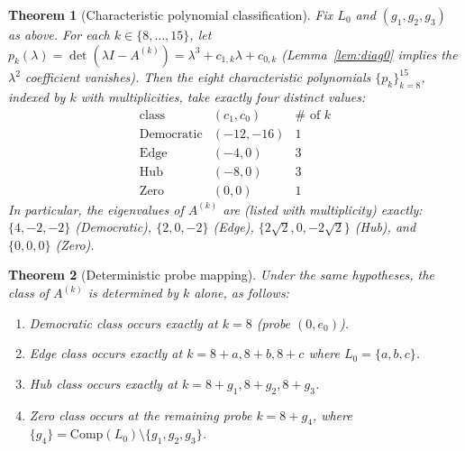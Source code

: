\documentclass[12pt,a4paper]{article}
\newtheorem{theorem}{Theorem}[section]
\begin{document}
\begin{theorem}[Characteristic polynomial classification]\label{thm:classification}
Fix $L_0$ and $(g_1,g_2,g_3)$ as above.
For each $k\in\{8,\dots,15\}$, let $p_k(\lambda)=\det(\lambda I-A^{(k)})=\lambda^3+c_{1,k}\lambda+c_{0,k}$ (Lemma~\ref{lem:diag0} implies the $\lambda^2$ coefficient vanishes).
Then the eight characteristic polynomials $\{p_k\}_{k=8}^{15}$, indexed by $k$ with multiplicities, take exactly four distinct values:
\[
\begin{array}{c|c|c}
\text{class} & (c_1,c_0) & \#\text{ of }k\\\hline
\text{Democratic} & (-12,-16) & 1\\
\text{Edge} & (-4,0) & 3\\
\text{Hub} & (-8,0) & 3\\
\text{Zero} & (0,0) & 1
\end{array}
\]
In particular, the eigenvalues of $A^{(k)}$ are (listed with multiplicity) exactly:
$\{4, -2, -2\}$ (Democratic), $\{2, 0, -2\}$ (Edge), $\{2\sqrt{2}, 0, -2\sqrt{2}\}$ (Hub), and $\{0, 0, 0\}$ (Zero).
\end{theorem}

\begin{theorem}[Deterministic probe mapping]\label{thm:strong}
Under the same hypotheses, the class of $A^{(k)}$ is determined by $k$ alone, as follows:
\begin{enumerate}
\item Democratic class occurs exactly at $k=8$ (probe $(0,e_0)$).
\item Edge class occurs exactly at $k=8+a,8+b,8+c$ where $L_0=\{a,b,c\}$.
\item Hub class occurs exactly at $k=8+g_1,8+g_2,8+g_3$.
\item Zero class occurs at the remaining probe $k=8+g_4$, where $\{g_4\}=\mathrm{Comp}(L_0)\setminus\{g_1,g_2,g_3\}$.
\end{enumerate}
\end{theorem}
\end{document}
